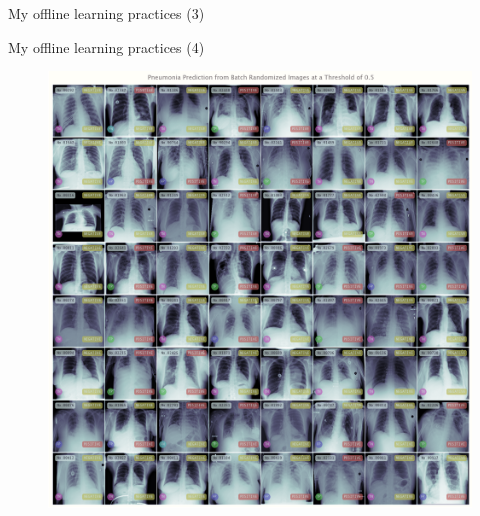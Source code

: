 \documentclass{beamer}
\begin{document}
\begin{frame}[fragile]{My offline learning practices (3)}
\begin{figure}[!htb]
			\endminipage\hfill
			\endminipage
		\end{figure}
	\end{frame}
	
	\begin{frame}[fragile]{My offline learning practices (4)}
		\begin{figure}[!htb]
			\vspace{-.25em}
			\centering\includegraphics[width=\linewidth]{images/deep_learning_5_1_1.png}
			\endminipage\hfill

\end{figure}
\end{frame}
\end{document}
